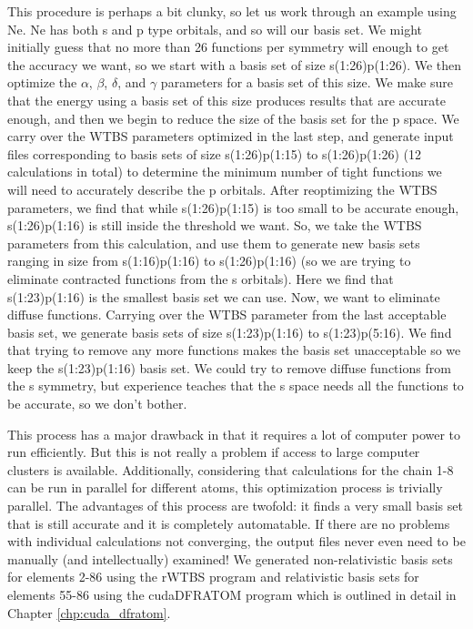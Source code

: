 This procedure is perhaps a bit clunky, so let us work through an example using Ne. Ne has both s and p type orbitals, and so will our basis set. We might initially guess that no more than 26 functions per symmetry will enough to get the accuracy we want, so we start with a basis set of size s(1:26)p(1:26). We then optimize the $\alpha$, $\beta$, $\delta$, and $\gamma$ parameters for a basis set of this size. We make sure that the energy using a basis set of this size produces results that are accurate enough, and then we begin to reduce the size of the basis set for the p space. We carry over the WTBS parameters optimized in the last step, and generate input files corresponding to basis sets of size s(1:26)p(1:15) to s(1:26)p(1:26) (12 calculations in total) to determine the minimum number of tight functions we will need to accurately describe the p orbitals. After reoptimizing the WTBS parameters, we find that while s(1:26)p(1:15) is too small to be accurate enough, s(1:26)p(1:16) is still inside the threshold we want. So, we take the WTBS parameters from this calculation, and use them to generate new basis sets ranging in size from s(1:16)p(1:16) to s(1:26)p(1:16) (so we are trying to eliminate contracted functions from the s orbitals). Here we find that s(1:23)p(1:16) is the smallest basis set we can use. Now, we want to eliminate diffuse functions. Carrying over the WTBS parameter from the last acceptable basis set, we generate basis sets of size s(1:23)p(1:16) to s(1:23)p(5:16). We find that trying to remove any more functions makes the basis set unacceptable so we keep the s(1:23)p(1:16) basis set. We could try to remove diffuse functions from the s symmetry, but experience teaches that the s space needs all the functions to be accurate, so we don't bother.

This process has a major drawback in that it requires a lot of computer power to run efficiently. But this is not really a problem if access to large computer clusters is available. Additionally, considering that calculations for the chain 1-8 can be run in parallel for different atoms, this optimization process is trivially parallel. The advantages of this process are twofold: it finds a very small basis set that is still accurate and it is completely automatable. If there are no problems with individual calculations not converging, the output files never even need to be manually (and intellectually) examined! We generated non-relativistic basis sets for elements 2-86 using the rWTBS program\cite{WTBS, WTBS2, WTBS3, WTBS4, WTBS5, WTBS6} and relativistic basis sets for elements 55-86 using the cudaDFRATOM program which is outlined in detail in Chapter \ref{chp:cuda_dfratom}.

